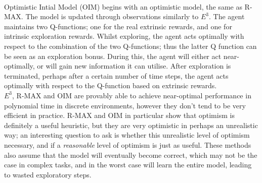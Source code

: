 \\ Optimistic Intial Model (OIM) \cite{10.1145/1390156.1390288} begins with an optimistic model, the same as R-MAX. The model is updated through observations similarly to $E^3$. The agent maintains two Q-functions; one for the real extrinsic rewards, and one for intrinsic exploration rewards. Whilst exploring, the agent acts optimally with respect to the combination of the two Q-functions; thus the latter Q function can be seen as an exploration bonus. During this, the agent will either act near-optimally, or will gain new information it can utilise. After exploration is terminated, perhaps after a certain number of time steps, the agent acts optimally with respect to the Q-function based on extrinsic rewards.
\\ $E^3$, R-MAX and OIM are provably able to achieve near-optimal performance in polynomial time in discrete environments, however they don't tend to be very efficient in practice. R-MAX and OIM in particular show that optimism is definitely a useful heuristic, but they are very optimistic in perhaps an unrealistic way; an interesting question to ask is whether this unrealistic level of optimism necessary, and if a \textit{reasonable} level of optimism is just as useful. These methods also assume that the model will eventually become correct, which may not be the case in complex tasks, and in the worst case will learn the entire model, leading to wasted exploratory steps.
